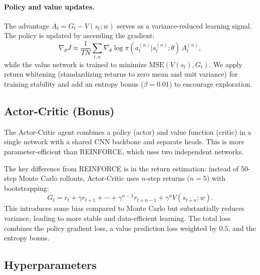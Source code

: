 \documentclass[11pt, a4paper]{article}
\begin{document}
\paragraph{Policy and value updates.}
The advantage $A_t = G_t - V(s_t; w)$ serves as a variance-reduced learning signal. The policy
is updated by ascending the gradient:
\begin{equation}
\nabla_\theta J \approx \frac{1}{TN} \sum_{t,n} \nabla_\theta \log \pi(a_t^{(n)} | s_t^{(n)}; \theta) \, A_t^{(n)},
\end{equation}
while the value network is trained to minimize $\text{MSE}(V(s_t), G_t)$. We apply return
whitening (standardizing returns to zero mean and unit variance) for training stability and
add an entropy bonus ($\beta{=}0.01$) to encourage exploration.

\subsection{Actor-Critic (Bonus)}

The Actor-Critic agent combines a policy (actor) and value function (critic) in a single
network with a shared CNN backbone and separate heads. This is more parameter-efficient
than REINFORCE, which uses two independent networks.

The key difference from REINFORCE is in the return estimation: instead of 50-step Monte Carlo
rollouts, Actor-Critic uses $n$-step returns ($n{=}5$) with bootstrapping:
\begin{equation}
G_t = r_t + \gamma r_{t+1} + \cdots + \gamma^{n-1} r_{t+n-1} + \gamma^n V(s_{t+n}; w).
\end{equation}
This introduces some bias compared to Monte Carlo but substantially reduces variance,
leading to more stable and data-efficient learning. The total loss combines the policy gradient
loss, a value prediction loss weighted by $0.5$, and the entropy bonus.

\subsection{Hyperparameters}
\end{document}
